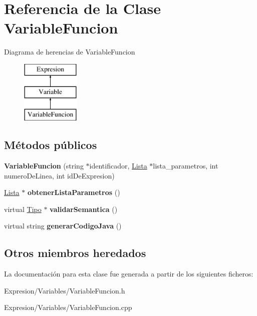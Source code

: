 \hypertarget{class_variable_funcion}{\section{Referencia de la Clase Variable\-Funcion}
\label{class_variable_funcion}
}
Diagrama de herencias de Variable\-Funcion\begin{figure}[H]
\begin{center}
\leavevmode
\includegraphics[height=3.000000cm]{class_variable_funcion}
\end{center}
\end{figure}
\subsection*{Métodos públicos}
\begin{DoxyCompactItemize}
\item 
\hypertarget{class_variable_funcion_a28636624786c76182df8d47cba467093}{{\bfseries Variable\-Funcion} (string $\ast$identificador, \hyperlink{class_lista}{Lista} $\ast$lista\-\_\-parametros, int numero\-De\-Linea, int id\-De\-Expresion)}\label{class_variable_funcion_a28636624786c76182df8d47cba467093}

\item 
\hypertarget{class_variable_funcion_a44786fb494821bd2e13ac1b2446dbeb2}{\hyperlink{class_lista}{Lista} $\ast$ {\bfseries obtener\-Lista\-Parametros} ()}\label{class_variable_funcion_a44786fb494821bd2e13ac1b2446dbeb2}

\item 
\hypertarget{class_variable_funcion_ad40285a515672a3f79c4fb587ae53945}{virtual \hyperlink{class_tipo}{Tipo} $\ast$ {\bfseries validar\-Semantica} ()}\label{class_variable_funcion_ad40285a515672a3f79c4fb587ae53945}

\item 
\hypertarget{class_variable_funcion_aa9c1cb8bc1c55e50da107ae20b5585b7}{virtual string {\bfseries generar\-Codigo\-Java} ()}\label{class_variable_funcion_aa9c1cb8bc1c55e50da107ae20b5585b7}

\end{DoxyCompactItemize}
\subsection*{Otros miembros heredados}


La documentación para esta clase fue generada a partir de los siguientes ficheros\-:\begin{DoxyCompactItemize}
\item 
Expresion/\-Variables/Variable\-Funcion.\-h\item 
Expresion/\-Variables/Variable\-Funcion.\-cpp\end{DoxyCompactItemize}
